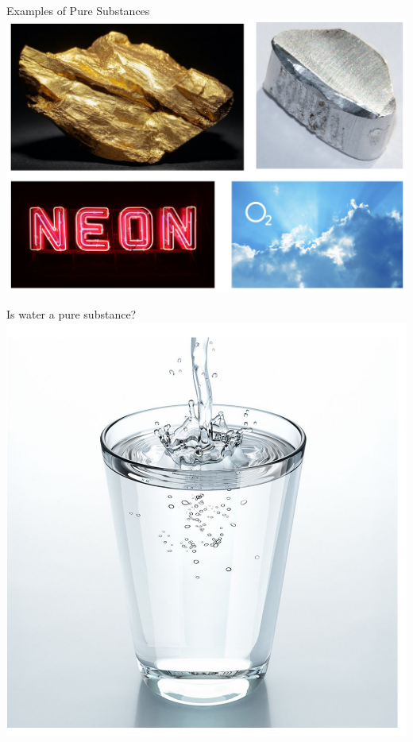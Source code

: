 \documentclass[11pt]{beamer}
\begin{document}
\begin{frame}{Examples of Pure Substances}
  \centering
  \includegraphics[width=\linewidth]{pure}
\end{frame}

\begin{frame}{Is water a pure substance?}
  \centering
  \includegraphics[scale=0.2]{water}
\end{frame}
\end{document}
